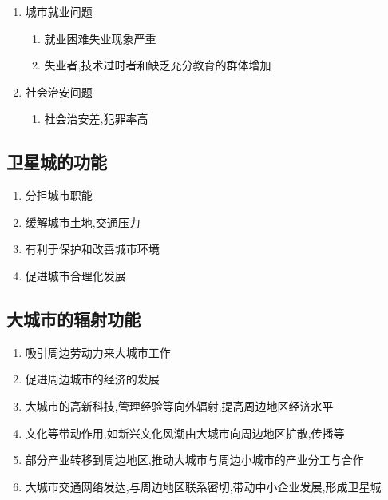 \documentclass[a4paper]{article}
\begin{document}
\begin{enumerate}
\begin{enumerate}
\begin{enumerate}
\begin{enumerate}
                \end{enumerate}
                \item 城市就业问题
                \begin{enumerate}
                    \item 就业困难失业现象严重
                    \item 失业者,技术过时者和缺乏充分教育的群体增加
                \end{enumerate}
                \item 社会治安间题
                \begin{enumerate}
                    \item 社会治安差,犯罪率高
                \end{enumerate}
            \end{enumerate}
        \end{enumerate}
    \end{enumerate}
    \subsection{卫星城的功能}
    \begin{enumerate}
        \item 分担城市职能
        \item 缓解城市土地,交通压力
        \item 有利于保护和改善城市环境
        \item 促进城市合理化发展
    \end{enumerate}
    \subsection{大城市的辐射功能}
    \begin{enumerate}
        \item 吸引周边劳动力来大城市工作
        \item 促进周边城市的经济的发展
        \item 大城市的高新科技,管理经验等向外辐射,提高周边地区经济水平
        \item 文化等带动作用,如新兴文化风潮由大城市向周边地区扩散,传播等
        \item 部分产业转移到周边地区,推动大城市与周边小城市的产业分工与合作
        \item 大城市交通网络发达,与周边地区联系密切,带动中小企业发展,形成卫星城
    \end{enumerate}
\end{document}
